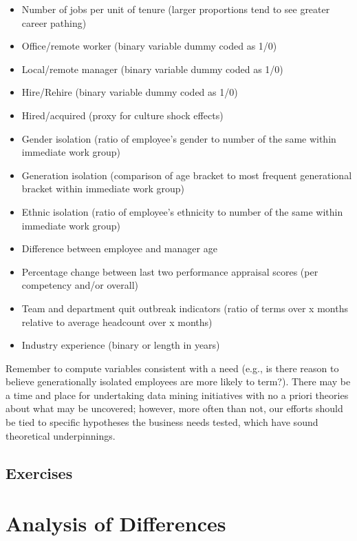 \documentclass[]{book}
\providecommand{\tightlist}{%
  \setlength{\itemsep}{0pt}\setlength{\parskip}{0pt}}
\begin{document}
\begin{itemize}
\tightlist
\item
  Number of jobs per unit of tenure (larger proportions tend to see greater career pathing)
\item
  Office/remote worker (binary variable dummy coded as 1/0)
\item
  Local/remote manager (binary variable dummy coded as 1/0)
\item
  Hire/Rehire (binary variable dummy coded as 1/0)
\item
  Hired/acquired (proxy for culture shock effects)
\item
  Gender isolation (ratio of employee's gender to number of the same within immediate work
  group)
\item
  Generation isolation (comparison of age bracket to most frequent generational bracket within
  immediate work group)
\item
  Ethnic isolation (ratio of employee's ethnicity to number of the same within immediate work
  group)
\item
  Difference between employee and manager age
\item
  Percentage change between last two performance appraisal scores (per competency and/or
  overall)
\item
  Team and department quit outbreak indicators (ratio of terms over x months relative to average
  headcount over x months)
\item
  Industry experience (binary or length in years)
\end{itemize}

Remember to compute variables consistent with a need (e.g., is there reason to believe generationally isolated employees are more likely to term?). There may be a time and place for undertaking data mining initiatives with no a priori theories about what may be uncovered; however, more often than not, our efforts should be tied to specific hypotheses the business needs tested, which have sound theoretical underpinnings.

\hypertarget{exercises-4}{%
\section{Exercises}\label{exercises-4}}

\hypertarget{aod}{%
\chapter{Analysis of Differences}\label{aod}}
\end{document}
